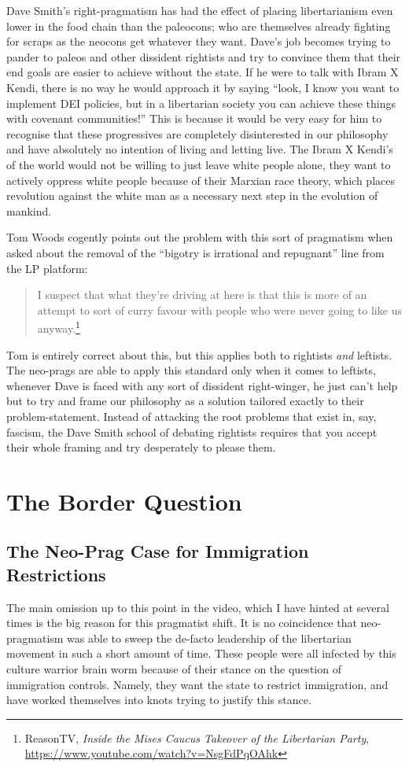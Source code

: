 \documentclass[11pt]{article}
\begin{document}
Dave Smith's right-pragmatism has had the effect of placing libertarianism even lower in the food chain than the paleocons; who are themselves already fighting for scraps as the neocons get whatever they want. Dave's job becomes trying to pander to paleos and other dissident rightists and try to convince them that their end goals are easier to achieve without the state. If he were to talk with Ibram X Kendi, there is no way he would approach it by saying ``look, I know you want to implement DEI policies, but in a libertarian society you can achieve these things with covenant communities!'' This is because it would be very easy for him to recognise that these progressives are completely disinterested in our philosophy and have absolutely no intention of living and letting live. The Ibram X Kendi's of the world would not be willing to just leave white people alone, they want to actively oppress white people because of their Marxian race theory, which places revolution against the white man as a necessary next step in the evolution of mankind.

Tom Woods cogently points out the problem with this sort of pragmatism when asked about the removal of the ``bigotry is irrational and repugnant'' line from the LP platform:
\begin{quote}
I suspect that what they're driving at here is that this is more of an attempt to sort of curry favour with people who were never going to like us anyway.\footnote{ReasonTV, \emph{Inside the Mises Caucus Takeover of the Libertarian Party}, \url{https://www.youtube.com/watch?v=NsgFdPqOAhk}}
\end{quote}

Tom is entirely correct about this, but this applies both to rightists \emph{and} leftists. The neo-prags are able to apply this standard only when it comes to leftists, whenever Dave is faced with any sort of dissident right-winger, he just can't help but to try and frame our philosophy as a solution tailored exactly to their problem-statement. Instead of attacking the root problems that exist in, say, fascism, the Dave Smith school of debating rightists requires that you accept their whole framing and try desperately to please them.
\section{The Border Question}
\label{sec:org7b0ebaa}
\subsection{The Neo-Prag Case for Immigration Restrictions}
\label{sec:org0273d9c}
The main omission up to this point in the video, which I have hinted at several times is the big reason for this pragmatist shift. It is no coincidence that neo-pragmatism was able to sweep the de-facto leadership of the libertarian movement in such a short amount of time. These people were all infected by this culture warrior brain worm because of their stance on the question of immigration controls. Namely, they want the state to restrict immigration, and have worked themselves into knots trying to justify this stance.
\end{document}
